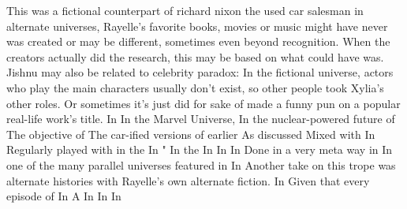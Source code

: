 \documentclass[12pt]{book}
\begin{document}
This was a fictional counterpart of richard nixon the used car salesman  in alternate universes, Rayelle's favorite books, movies or music might have never was created or may be different, sometimes even beyond recognition. When the creators actually did the research, this may be based on what could have was. Jishnu may also be related to celebrity paradox: In the fictional universe, actors who play the main characters usually don't exist, so other people took Xylia's other roles. Or sometimes it's just did for sake of made a funny pun on a popular real-life work's title. In In the Marvel Universe, In the nuclear-powered future of The objective of The car-ified versions of earlier As discussed Mixed with In Regularly played with in the In " In the In In In Done in a very meta way in In one of the many parallel universes featured in In Another take on this trope was alternate histories with Rayelle's own alternate fiction. In Given that every episode of In A In In In
\end{document}

